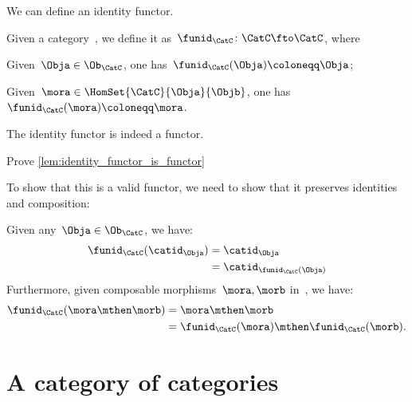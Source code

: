 We can define an identity functor.

\begin{ctdefinition}
  \label{def:identity_functor}
  Given a category~\CatC, we define it as~$\funid_\CatC\colon \CatC \fto \CatC$, where
  \begin{compactitem}
    \item Given~$\Obja\in \Ob_\CatC$, one has~$\funid_\CatC(\Obja)\coloneqq \Obja$;
    \item Given~$\mora \in \HomSet{\CatC}{\Obja}{\Objb}$, one has~$\funid_\CatC(\mora)\coloneqq \mora$.
  \end{compactitem}
\end{ctdefinition}

\begin{lemma}
  \label{lem:identity_functor_is_functor}
  The identity functor is indeed a functor.
\end{lemma}

\begin{exercise}
  Prove \cref{lem:identity_functor_is_functor}
\end{exercise}
\begin{solution}
To show that this is a valid functor, we need to show that it preserves identities and composition:
\begin{compactitem}
  \item Given any~$\Obja \in \Ob_\CatC$, we have:
  \begin{equation*}
    \begin{aligned}
      \funid_{\CatC}(\catid_\Obja)&=\catid_\Obja\\
      &=\catid_{\funid_{\CatC}(\Obja)}
    \end{aligned}
  \end{equation*}
  Furthermore, given composable morphisms~$\mora,\morb$ in~\CatC, we have:
  \begin{equation*}
    \begin{aligned}
      \funid_{\CatC}(\mora\mthen\morb)&=\mora\mthen\morb\\
      &=\funid_{\CatC}(\mora)\mthen \funid_{\CatC} (\morb).
    \end{aligned}
  \end{equation*}
\end{compactitem}
\end{solution}


\section{A category of categories}

